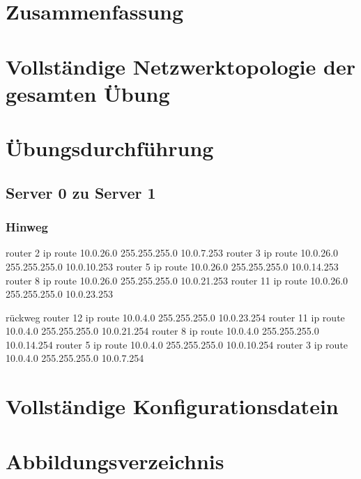 \documentclass[a4paper]{article}
\begin{document}
\section{Zusammenfassung}

\newpage

\section{Vollständige Netzwerktopologie der gesamten Übung}

\newpage

\section{Übungsdurchführung}

\subsection{Server 0 zu Server 1}

\subsubsection{Hinweg}
router 2
ip route 10.0.26.0 255.255.255.0 10.0.7.253 
router 3
ip route 10.0.26.0 255.255.255.0 10.0.10.253
router 5
ip route 10.0.26.0 255.255.255.0 10.0.14.253
router 8
ip route 10.0.26.0 255.255.255.0 10.0.21.253
router 11
ip route 10.0.26.0 255.255.255.0 10.0.23.253

rückweg
router 12
ip route 10.0.4.0 255.255.255.0 10.0.23.254
router 11
ip route 10.0.4.0 255.255.255.0 10.0.21.254
router 8
ip route 10.0.4.0 255.255.255.0 10.0.14.254
router 5
ip route 10.0.4.0 255.255.255.0 10.0.10.254
router 3
ip route 10.0.4.0 255.255.255.0 10.0.7.254

\newpage

\section{Vollständige Konfigurationsdatein}

\newpage

\section{Abbildungsverzeichnis}

\listoffigures
\end{document}
